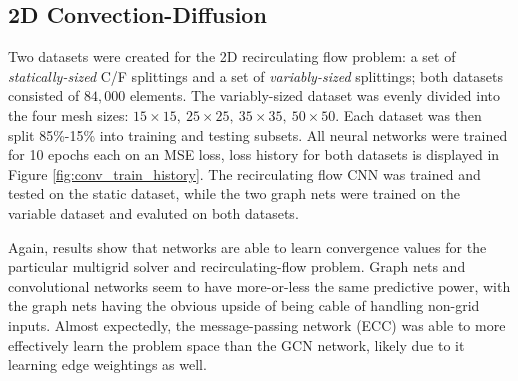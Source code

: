 \documentclass{siamart190516}
\begin{document}
\subsection{2D Convection-Diffusion}

Two datasets were created for the 2D recirculating flow problem: a set of \textit{statically-sized} C/F splittings and a set of \textit{variably-sized} splittings; both datasets consisted of $84,000$ elements.  The variably-sized dataset was evenly divided into the four mesh sizes: $15\times 15,\: 25\times 25,\: 35\times 35,\: 50\times 50$.  Each dataset was then split 85\%-15\% into training and testing subsets.  All neural networks were trained for 10 epochs each on an MSE loss, loss history for both datasets is displayed in Figure \ref{fig:conv_train_history}.  The recirculating flow CNN was trained and tested on the static dataset, while the two graph nets were trained on the variable dataset and evaluted on both datasets.

Again, results show that networks are able to learn convergence values for the particular multigrid solver and recirculating-flow problem.  Graph nets and convolutional networks seem to have more-or-less the same predictive power, with the graph nets having the obvious upside of being cable of handling non-grid inputs.  Almost expectedly, the message-passing network (ECC) was able to more effectively learn the problem space than the GCN network, likely due to it learning edge weightings as well.

\end{document}
